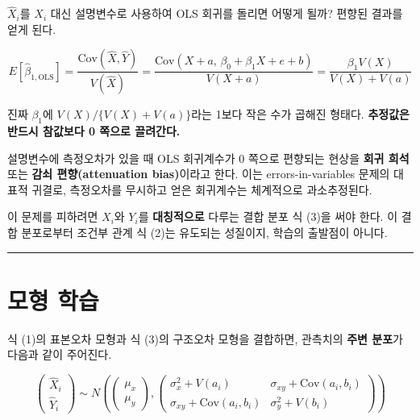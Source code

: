 \documentclass[
  letterpaper,
  DIV=11,
  numbers=noendperiod]{scrreprt}
\begin{document}
\(\hat{X}_i\)를 \(X_i\) 대신 설명변수로 사용하여 OLS 회귀를 돌리면
어떻게 될까? 편향된 결과를 얻게 된다.

\[E[\hat{\beta}_{1,\text{OLS}}] = \frac{\text{Cov}(\hat{X}, \hat{Y})}{V(\hat{X})} = \frac{\text{Cov}(X + a,\, \beta_0 + \beta_1 X + e + b)}{V(X + a)} = \frac{\beta_1 V(X)}{V(X) + V(a)}\]

진짜 \(\beta_1\)에 \(V(X)/\{V(X)+V(a)\}\)라는 1보다 작은 수가 곱해진
형태다. \textbf{추정값은 반드시 참값보다 0 쪽으로 끌려간다.}

\begin{tcolorbox}[enhanced jigsaw, arc=.35mm, bottomrule=.15mm, bottomtitle=1mm, breakable, colback=white, colbacktitle=quarto-callout-important-color!10!white, colframe=quarto-callout-important-color-frame, coltitle=black, left=2mm, leftrule=.75mm, opacityback=0, opacitybacktitle=0.6, rightrule=.15mm, title=\textcolor{quarto-callout-important-color}{\faExclamation}\hspace{0.5em}{회귀 희석 (Regression Dilution)}, titlerule=0mm, toprule=.15mm, toptitle=1mm]

설명변수에 측정오차가 있을 때 OLS 회귀계수가 0 쪽으로 편향되는 현상을
\textbf{회귀 희석} 또는 \textbf{감쇠 편향(attenuation bias)}이라고 한다.
이는 errors-in-variables 문제의 대표적 귀결로, 측정오차를 무시하고 얻은
회귀계수는 체계적으로 과소추정된다.

\end{tcolorbox}

이 문제를 피하려면 \(X_i\)와 \(Y_i\)를 \textbf{대칭적으로} 다루는 결합
분포 식 (3)을 써야 한다. 이 결합 분포로부터 조건부 관계 식 (2)는
유도되는 성질이지, 학습의 출발점이 아니다.

\begin{center}\rule{0.5\linewidth}{0.5pt}\end{center}

\section{모형 학습}\label{uxbaa8uxd615-uxd559uxc2b5}

식 (1)의 표본오차 모형과 식 (3)의 구조오차 모형을 결합하면, 관측치의
\textbf{주변 분포}가 다음과 같이 주어진다.

\[\begin{pmatrix} \hat{X}_i \\ \hat{Y}_i \end{pmatrix} \sim N\left( \begin{pmatrix} \mu_x \\ \mu_y \end{pmatrix}, \begin{pmatrix} \sigma_x^2 + V(a_i) & \sigma_{xy} + \text{Cov}(a_i, b_i) \\ \sigma_{xy} + \text{Cov}(a_i, b_i) & \sigma_y^2 + V(b_i) \end{pmatrix} \right) \tag{4}\]
\end{document}
